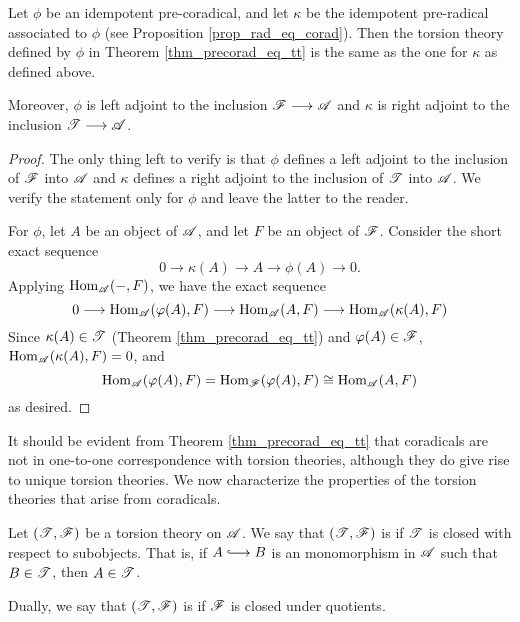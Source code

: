 \begin{cor}\label{cor_tt_ref_and_coref}
Let $\phi$ be an idempotent pre-coradical, and let $\kappa$ be the 
idempotent pre-radical associated to $\phi$ (see Proposition
\ref{prop_rad_eq_corad}). Then the torsion theory defined by $\phi$
in Theorem \ref{thm_precorad_eq_tt} is the same as the one for
$\kappa$ as defined above.

Moreover, $\phi$ is left adjoint to the inclusion $\mathscr{F} \longrightarrow 
\mathscr{A}$ and $\kappa$ is right adjoint to the inclusion $\mathscr{T} 
\longrightarrow \mathscr{A}$.
\end{cor}
\begin{proof}
The only thing left to verify is that $\phi$ defines a left 
adjoint to the inclusion of $\mathscr{F}$ into $\mathscr{A}$ and $\kappa$ 
defines a right adjoint to the inclusion of $\mathscr{T}$ into 
$\mathscr{A}$. We verify the statement only for $\phi$ and leave the 
latter to the reader.  

For $\phi$, let $A$ be an object of $\mathscr{A}$, and let $F$ be an 
object of $\mathscr{F}$. Consider the short exact sequence
\[
0 \to \kappa(A) \to A \to \phi(A) \to 0.
\]
Applying $\mathrm{Hom}_{\mathscr{A}}(-, F)$, we have the exact sequence
\[
0 \longrightarrow \mathrm{Hom}_{\mathscr{A}}(\varphi(A), F) \longrightarrow \mathrm{Hom}_{\mathscr{A}}(A, F) \longrightarrow
\mathrm{Hom}_{\mathscr{A}}(\kappa(A), F)
\]
Since $\kappa(A) \in \mathscr{T}$ (Theorem \ref{thm_precorad_eq_tt}) 
and $\varphi(A) \in \mathscr{F}$, $\mathrm{Hom}_{\mathscr{A}}(\kappa(A), F) = 0$, and
\[
\mathrm{Hom}_{\mathscr{A}}(\varphi(A), F) = \mathrm{Hom}_{\mathscr{F}}(\varphi(A), F) \cong
   \mathrm{Hom}_{\mathscr{A}}(A, F)
\]
as desired.
\end{proof}

It should be evident from Theorem \ref{thm_precorad_eq_tt} that
coradicals are not in one-to-one correspondence with torsion theories,
although they do give rise to unique torsion theories. We now
characterize the properties of the torsion theories that arise from
coradicals.

\begin{defn}
Let $(\mathscr{T}, \mathscr{F})$ be a torsion theory on $\mathscr{A}$. We say 
that $(\mathscr{T}, \mathscr{F})$ is  if $\mathscr{T}$ is 
closed with respect to subobjects. That is, if $A \into B$ is an 
monomorphism in $\mathscr{A}$ such that $B \in \mathscr{T}$, then $A \in 
\mathscr{T}$.

Dually, we say that $(\mathscr{T}, \mathscr{F})$ is  if
$\mathscr{F}$ is closed under quotients.
\end{defn}

